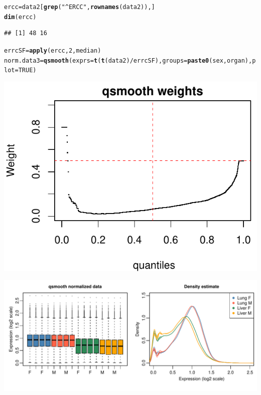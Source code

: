 \documentclass{article}\usepackage[]{graphicx}\usepackage[usenames,dvipsnames]{color}
\makeatletter
\def\maxwidth{ %
  \ifdim\Gin@nat@width>\linewidth
    \linewidth
  \else
    \Gin@nat@width
  \fi
}
\newcommand{\hlnum}[1]{\textcolor[rgb]{0.686,0.059,0.569}{#1}}%
\newcommand{\hlstr}[1]{\textcolor[rgb]{0.192,0.494,0.8}{#1}}%
\newcommand{\hlopt}[1]{\textcolor[rgb]{0,0,0}{#1}}%
\newcommand{\hlstd}[1]{\textcolor[rgb]{0.345,0.345,0.345}{#1}}%
\newcommand{\hlkwb}[1]{\textcolor[rgb]{0.69,0.353,0.396}{#1}}%
\newcommand{\hlkwc}[1]{\textcolor[rgb]{0.333,0.667,0.333}{#1}}%
\newcommand{\hlkwd}[1]{\textcolor[rgb]{0.737,0.353,0.396}{\textbf{#1}}}%
\newenvironment{kframe}{%
 \def\at@end@of@kframe{}%
 \ifinner\ifhmode%
  \def\at@end@of@kframe{\end{minipage}}%
  \begin{minipage}{\columnwidth}%
 \fi\fi%
 \def\FrameCommand##1{\hskip\@totalleftmargin \hskip-\fboxsep
 \colorbox{shadecolor}{##1}\hskip-\fboxsep
     \hskip-\linewidth \hskip-\@totalleftmargin \hskip\columnwidth}%
 \MakeFramed {\advance\hsize-\width
   \@totalleftmargin\z@ \linewidth\hsize
   \@setminipage}}%
 {\par\unskip\endMakeFramed%
 \at@end@of@kframe}
\newenvironment{knitrout}{}{} %
\makeatother
\begin{document}
\begin{knitrout}
\color{fgcolor}\begin{kframe}
\begin{alltt}
\hlstd{ercc} \hlkwb{=} \hlstd{data2[}\hlkwd{grep}\hlstd{(}\hlstr{"^ERCC"}\hlstd{,} \hlkwd{rownames}\hlstd{(data2)), ]}
\hlkwd{dim}\hlstd{(ercc)}
\end{alltt}
\begin{verbatim}
## [1] 48 16
\end{verbatim}
\begin{alltt}
\hlstd{errcSF} \hlkwb{=} \hlkwd{apply}\hlstd{(ercc,} \hlnum{2}\hlstd{, median)}
\hlstd{norm.data3} \hlkwb{=} \hlkwd{qsmooth}\hlstd{(}\hlkwc{exprs}\hlstd{=}\hlkwd{t}\hlstd{(}\hlkwd{t}\hlstd{(data2)}\hlopt{/}\hlstd{errcSF),} \hlkwc{groups}\hlstd{=}\hlkwd{paste0}\hlstd{(sex, organ),} \hlkwc{plot}\hlstd{=}\hlnum{TRUE}\hlstd{)}
\end{alltt}
\end{kframe}

{\centering \includegraphics[width=\maxwidth]{figure/qsmooth14-1} 

}



\end{knitrout}

\begin{knitrout}
\color{fgcolor}

{\centering \includegraphics[width=\maxwidth]{figure/norm_data14-1} 

}



\end{knitrout}
\end{document}
